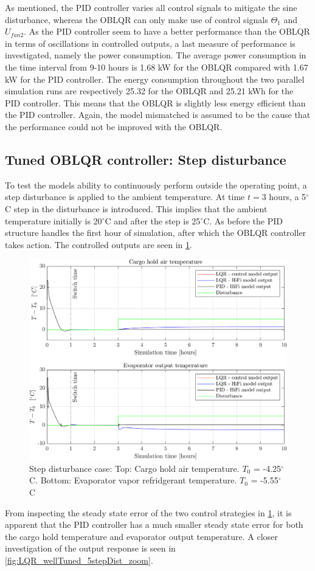 As mentioned, the PID controller varies all control signals to mitigate the sine disturbance, whereas the OBLQR can only make use of control signals $ \Theta_1 $ and $ U_{fan2} $. As the PID controller seem to have a better performance than the OBLQR in terms of oscillations in controlled outputs, a last measure of performance is investigated, namely the power consumption.  
The average power consumption in the time interval from 9-10 hours is 1.68 \si{kW} for the OBLQR compared with 1.67 \si{kW} for the PID controller. The energy consumption throughout the two parallel simulation runs are respectively 25.32 for the OBLQR and 25.21 \si{kWh} for the PID controller. This means that the OBLQR is slightly less energy efficient than the PID controller. Again, the model mismatched is assumed to be the cause that the performance could not be improved with the OBLQR.

\subsection{Tuned OBLQR controller: Step disturbance}
To test the models ability to continuously perform outside the operating point, a step disturbance is applied to the ambient temperature.  At time $t=3$ hours, a 5$^{\circ}$C step in the disturbance is introduced. This implies that the ambient temperature initially is 20$^{\circ}$C and after the step is 25$^{\circ}$C. As before the PID structure handles the first hour of simulation, after which the OBLQR controller takes action. The controlled outputs are seen in \cref{fig:LQR_wellTuned_5stepDist}.
\begin{figure}[H]
	\centering
	\includegraphics[width=1\textwidth]{Graphics/fig_LQRvsKresten_stepDist.png}
	\caption{Step disturbance case: Top: Cargo hold air temperature. $T_0$ = -4.25$^{\circ}$C. Bottom: Evaporator vapor refridgerant temperature. $T_0$ = -5.55$^{\circ}$C}
	\label{fig:LQR_wellTuned_5stepDist}
\end{figure}
From inspecting the steady state error of the two control strategies in \cref{fig:LQR_wellTuned_5stepDist}, it is apparent that the PID controller has a much smaller steady state error for both the cargo hold temperature and evaporator output temperature. A closer investigation of the output response is seen in
\cref{fig:LQR_wellTuned_5stepDist_zoom}. 

